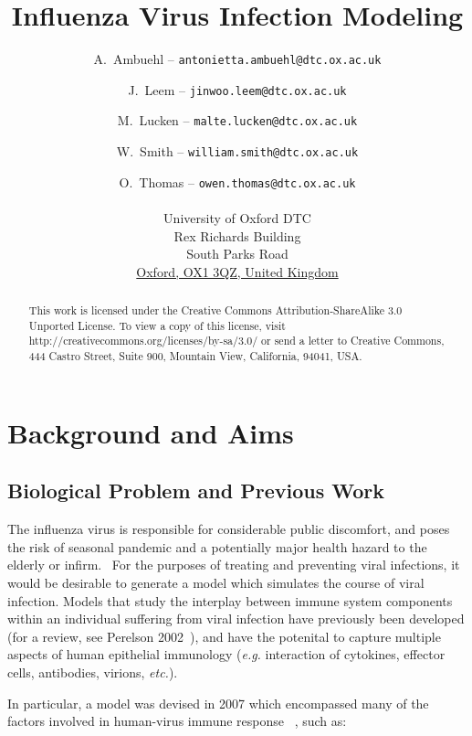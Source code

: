\documentclass[a4paper, 12pt]{report}
\title{Influenza Virus Infection Modeling}
\author{A.~Ambuehl -- \texttt{antonietta.ambuehl@dtc.ox.ac.uk} \and J.~Leem -- \texttt{jinwoo.leem@dtc.ox.ac.uk} \and M.~Lucken -- \texttt{malte.lucken@dtc.ox.ac.uk} \and W.~Smith -- \texttt{william.smith@dtc.ox.ac.uk} \and O.~Thomas -- \texttt{owen.thomas@dtc.ox.ac.uk} \\\\
University of Oxford DTC \\
Rex Richards Building \\
South Parks Road\\
\underline{Oxford, OX1 3QZ, United Kingdom}\\
}
\begin{document}
\maketitle

%


\begin{abstract}
This work is licensed under the Creative Commons Attribution-ShareAlike 3.0 Unported License. To view a copy of this license, visit http://creativecommons.org/licenses/by-sa/3.0/ or send a letter to Creative Commons, 444 Castro Street, Suite 900, Mountain View, California, 94041, USA.
\end{abstract}

\chapter{Background and Aims} %
\section{Biological Problem and Previous Work}

The influenza virus is responsible for considerable public discomfort, and poses the risk of seasonal pandemic and a potentially major health hazard to the elderly or infirm.~\cite{Smith} For the purposes of treating and preventing viral infections, it would be desirable to generate a model which simulates the course of viral infection. Models that study the interplay between immune system components within an individual suffering from viral infection have previously been developed (for a review, see Perelson 2002~\cite{Perelson}), and have the potenital to capture multiple aspects of human epithelial immunology (\textit{e.g.} interaction of cytokines, effector cells, antibodies, virions, \textit{etc.}). 

In particular, a model was devised in 2007 which encompassed many of the factors involved in human-virus immune response ~\cite{Hancioglu}, such as:
\end{document}
